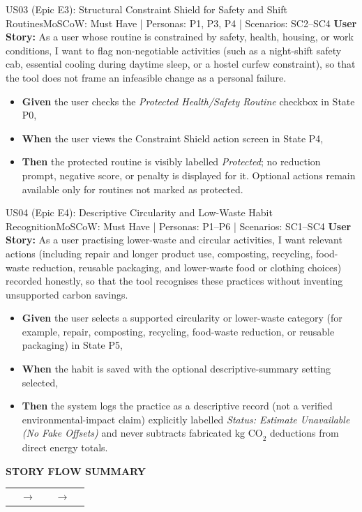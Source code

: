 \documentclass[12pt,a4paper]{article}
\makeatletter
\renewcommand{\arraystretch}{1.38}
\newcommand{\storyflow}[3]{%
  \par\Needspace{5\baselineskip}\vspace{0.08cm}%
  \begin{tcolorbox}[
    enhanced,width=\linewidth,
    colback=RowGray!72,colframe=RuleGray,
    boxrule=0.5pt,arc=1.2mm,
    borderline west={2pt}{0pt}{Teal},
    left=9pt,right=9pt,top=9pt,bottom=9pt,
    before skip=0pt,after skip=0pt
  ]
    {\sffamily\footnotesize\bfseries\color{Teal}STORY FLOW SUMMARY}\par
    \vspace{0.18cm}
    \renewcommand{\arraystretch}{1.0}%
    \begin{tabularx}{\linewidth}{@{}>{\centering\arraybackslash}X
      >{\centering\arraybackslash}p{0.52cm}
      >{\centering\arraybackslash}X
      >{\centering\arraybackslash}p{0.52cm}
      >{\centering\arraybackslash}X@{}}
      \fcolorbox{Teal!42}{white}{%
        \parbox[c][1.65cm][c]{\dimexpr\hsize-2\fboxsep-2\fboxrule\relax}{%
          \centering\sffamily\small\bfseries\color{Teal}01\par
          \vspace{3pt}\normalfont\small\color{Navy}#1}} &
      {\color{Teal}\normalsize$\to$} &
      \fcolorbox{Teal!42}{white}{%
        \parbox[c][1.65cm][c]{\dimexpr\hsize-2\fboxsep-2\fboxrule\relax}{%
          \centering\sffamily\small\bfseries\color{Teal}02\par
          \vspace{3pt}\normalfont\small\color{Navy}#2}} &
      {\color{Teal}\normalsize$\to$} &
      \fcolorbox{Teal!42}{white}{%
        \parbox[c][1.65cm][c]{\dimexpr\hsize-2\fboxsep-2\fboxrule\relax}{%
          \centering\sffamily\small\bfseries\color{Teal}03\par
          \vspace{3pt}\normalfont\small\color{Navy}#3}}
    \end{tabularx}
  \end{tcolorbox}
  \vspace{0.08cm}%
}
\makeatother
\begin{document}
\clearpage
\Needspace{0.30\textheight}
\begin{storybox}{US03 (Epic E3): Structural Constraint Shield for Safety and Shift Routines}{MoSCoW: Must Have | Personas: P1, P3, P4 | Scenarios: SC2--SC4}
\textbf{User Story:} As a user whose routine is constrained by safety, health, housing, or work conditions, I want to flag non-negotiable activities (such as a night-shift safety cab, essential cooling during daytime sleep, or a hostel curfew constraint), so that the tool does not frame an infeasible change as a personal failure.
\begin{itemize}
    \item \textbf{Given} the user checks the \textit{Protected Health/Safety Routine} checkbox in State P0,
    \item \textbf{When} the user views the Constraint Shield action screen in State P4,
    \item \textbf{Then} the protected routine is visibly labelled \textit{Protected}; no reduction prompt, negative score, or penalty is displayed for it. Optional actions remain available only for routines not marked as protected.
\end{itemize}
\end{storybox}

\vspace{0.28cm}

\Needspace{0.30\textheight}
\begin{storybox}{US04 (Epic E4): Descriptive Circularity and Low-Waste Habit Recognition}{MoSCoW: Must Have | Personas: P1--P6 | Scenarios: SC1--SC4}
\textbf{User Story:} As a user practising lower-waste and circular activities, I want relevant actions (including repair and longer product use, composting, recycling, food-waste reduction, reusable packaging, and lower-waste food or clothing choices) recorded honestly, so that the tool recognises these practices without inventing unsupported carbon savings.
\begin{itemize}
    \item \textbf{Given} the user selects a supported circularity or lower-waste category (for example, repair, composting, recycling, food-waste reduction, or reusable packaging) in State P5,
    \item \textbf{When} the habit is saved with the optional descriptive-summary setting selected,
    \item \textbf{Then} the system logs the practice as a descriptive record (not a verified environmental-impact claim) explicitly labelled \textit{Status: Estimate Unavailable (No Fake Offsets)} and never subtracts fabricated $\text{kg CO}_2$ deductions from direct energy totals.
\end{itemize}
\end{storybox}
\storyflow{Flag constrained routine as protected}{Record circular practice}{No penalty or fabricated credit}
\end{document}
